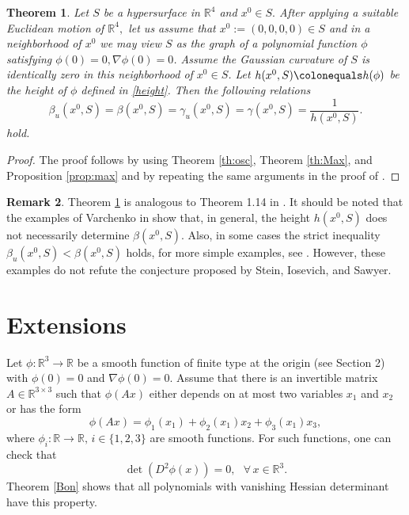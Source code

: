 \documentclass[a4paper, 11pt]{article}
\theoremstyle{plain}
\newtheorem{theorem}{Theorem}[section]
\theoremstyle{definition}
\theoremstyle{lemma}
\theoremstyle{Remark}
\newtheorem{Remark}[theorem]{Remark}
\theoremstyle{proposition}
\theoremstyle{corollary}
\theoremstyle{example}
\theoremstyle{assumption}
\begin{document}
\begin{theorem}\label{Main}
Let $S$ be a  hypersurface in $\mathbb{R}^4$ and  $x^0\in S.$ After applying a suitable Euclidean motion of $\mathbb{R}^4,$ let us assume that $x^0:=(0, 0, 0, 0)\in S$ and in a neighborhood of  $x^0$ we may view $S$ as the graph of a polynomial function $\phi$ satisfying  $\phi(0)=0, \nabla\phi(0)=0$. Assume the   Gaussian curvature of $S$ is identically zero in this neighborhood of $x^0\in S$. Let $h(x^0, S)\colonequals h(\phi)$ be the height of $\phi$ defined in \eqref{height}. %
Then the following relations
\begin{equation}\label{maineq}
\beta_u(x^0, S)=\beta(x^0, S)=\gamma_u(x^0, S)=\gamma(x^0, S)=\frac{1}{h(x^0, S)}.
\end{equation}
hold.
\end{theorem}
\begin{proof}
The proof  follows by using  Theorem \ref{th:osc}, Theorem \ref{th:Max}, and  Proposition \ref{prop:max} and by repeating the same arguments in the proof of \cite[Theorem 1.14]{I.K.M}.
\end{proof}
\begin{Remark}
 Theorem \ref{Main} is analogous to Theorem 1.14 in \cite{I.K.M}. It should be noted that the examples of Varchenko in  \cite{Var}  show that, in general,  the height $h(x^0, S)$ does not necessarily determine $\beta(x^0, S)$. Also, in some cases the strict inequality $\beta_u(x^0, S) < \beta(x^0, S)$ holds, for more simple examples, see  \cite{Gressman}. However, these examples do not refute the conjecture proposed by Stein, Iosevich, and Sawyer.

\end{Remark}


\section{Extensions}
Let $\phi:\mathbb{R}^3\to \mathbb{R}$  be a smooth function of finite type at the origin (see Section 2) with $\phi(0)=0$ and $\nabla \phi(0)=0$.  Assume that  there is an invertible matrix $A\in \mathbb{R}^{3\times 3}$ such that $\phi(Ax)$ either depends on at most two variables $x_1$ and $x_2$ or has the form
$$\phi(Ax)=\phi_1(x_1)+\phi_2(x_1)x_2+\phi_3(x_1)x_3,$$
where $\phi_i:\mathbb{R}\to \mathbb{R},\, i\in \{1,2,3\}$ are smooth functions. For such functions, one can check that
$$\det(D^2\phi(x))=0,\,\,\,\,\forall\,x\in \mathbb{R}^3.$$
Theorem \ref{Bon} shows that all polynomials with vanishing Hessian determinant have  this property.
\end{document}
